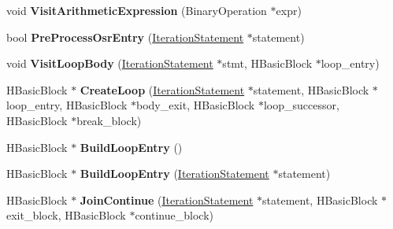 \begin{DoxyCompactItemize}
\item 
\hypertarget{classv8_1_1internal_1_1_h_optimized_graph_builder_a9ddefb168b57344a8c97e8dedaaf2874}{}void {\bfseries Visit\+Arithmetic\+Expression} (Binary\+Operation $\ast$expr)\label{classv8_1_1internal_1_1_h_optimized_graph_builder_a9ddefb168b57344a8c97e8dedaaf2874}

\item 
\hypertarget{classv8_1_1internal_1_1_h_optimized_graph_builder_a8c52099159d5f74670c37848303d8299}{}bool {\bfseries Pre\+Process\+Osr\+Entry} (\hyperlink{classv8_1_1internal_1_1_iteration_statement}{Iteration\+Statement} $\ast$statement)\label{classv8_1_1internal_1_1_h_optimized_graph_builder_a8c52099159d5f74670c37848303d8299}

\item 
\hypertarget{classv8_1_1internal_1_1_h_optimized_graph_builder_adab2bc33ce9f240bdf539926048bd910}{}void {\bfseries Visit\+Loop\+Body} (\hyperlink{classv8_1_1internal_1_1_iteration_statement}{Iteration\+Statement} $\ast$stmt, H\+Basic\+Block $\ast$loop\+\_\+entry)\label{classv8_1_1internal_1_1_h_optimized_graph_builder_adab2bc33ce9f240bdf539926048bd910}

\item 
\hypertarget{classv8_1_1internal_1_1_h_optimized_graph_builder_a15a353c5405316b66c423badfa430274}{}H\+Basic\+Block $\ast$ {\bfseries Create\+Loop} (\hyperlink{classv8_1_1internal_1_1_iteration_statement}{Iteration\+Statement} $\ast$statement, H\+Basic\+Block $\ast$loop\+\_\+entry, H\+Basic\+Block $\ast$body\+\_\+exit, H\+Basic\+Block $\ast$loop\+\_\+successor, H\+Basic\+Block $\ast$break\+\_\+block)\label{classv8_1_1internal_1_1_h_optimized_graph_builder_a15a353c5405316b66c423badfa430274}

\item 
\hypertarget{classv8_1_1internal_1_1_h_optimized_graph_builder_a06d4ed721cfc82ca156775a0161392ea}{}H\+Basic\+Block $\ast$ {\bfseries Build\+Loop\+Entry} ()\label{classv8_1_1internal_1_1_h_optimized_graph_builder_a06d4ed721cfc82ca156775a0161392ea}

\item 
\hypertarget{classv8_1_1internal_1_1_h_optimized_graph_builder_a02be9d4c7de27264a2aaabd081a5ced0}{}H\+Basic\+Block $\ast$ {\bfseries Build\+Loop\+Entry} (\hyperlink{classv8_1_1internal_1_1_iteration_statement}{Iteration\+Statement} $\ast$statement)\label{classv8_1_1internal_1_1_h_optimized_graph_builder_a02be9d4c7de27264a2aaabd081a5ced0}

\item 
\hypertarget{classv8_1_1internal_1_1_h_optimized_graph_builder_af1297ac97988e0dce844a587722b1e94}{}H\+Basic\+Block $\ast$ {\bfseries Join\+Continue} (\hyperlink{classv8_1_1internal_1_1_iteration_statement}{Iteration\+Statement} $\ast$statement, H\+Basic\+Block $\ast$exit\+\_\+block, H\+Basic\+Block $\ast$continue\+\_\+block)\label{classv8_1_1internal_1_1_h_optimized_graph_builder_af1297ac97988e0dce844a587722b1e94}


\end{DoxyCompactItemize}
